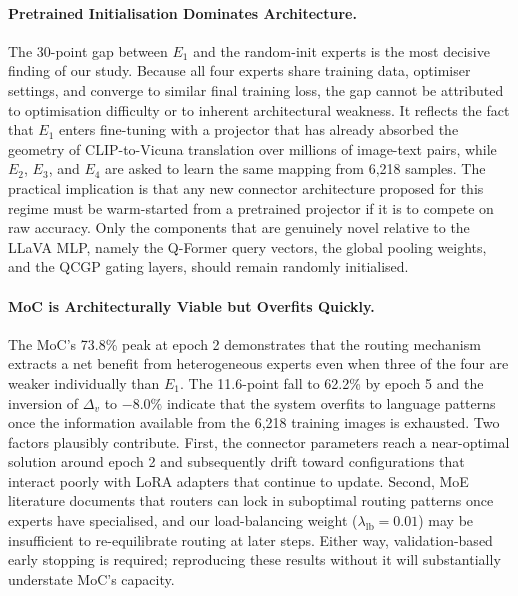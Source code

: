 \documentclass{article}
\begin{document}
\paragraph{Pretrained Initialisation Dominates Architecture.}
The 30-point gap between $E_1$ and the random-init experts is the most decisive finding of our study. Because all four experts share training data, optimiser settings, and converge to similar final training loss, the gap cannot be attributed to optimisation difficulty or to inherent architectural weakness. It reflects the fact that $E_1$ enters fine-tuning with a projector that has already absorbed the geometry of CLIP-to-Vicuna translation over millions of image-text pairs, while $E_2$, $E_3$, and $E_4$ are asked to learn the same mapping from 6{,}218 samples. The practical implication is that any new connector architecture proposed for this regime must be warm-started from a pretrained projector if it is to compete on raw accuracy. Only the components that are genuinely novel relative to the LLaVA MLP, namely the Q-Former query vectors, the global pooling weights, and the QCGP gating layers, should remain randomly initialised.

\paragraph{MoC is Architecturally Viable but Overfits Quickly.}
The MoC's 73.8\% peak at epoch 2 demonstrates that the routing mechanism extracts a net benefit from heterogeneous experts even when three of the four are weaker individually than $E_1$. The 11.6-point fall to 62.2\% by epoch 5 and the inversion of $\Delta_v$ to $-8.0\%$ indicate that the system overfits to language patterns once the information available from the 6{,}218 training images is exhausted. Two factors plausibly contribute. First, the connector parameters reach a near-optimal solution around epoch 2 and subsequently drift toward configurations that interact poorly with LoRA adapters that continue to update. Second, MoE literature documents that routers can lock in suboptimal routing patterns once experts have specialised, and our load-balancing weight ($\lambda_{\text{lb}} = 0.01$) may be insufficient to re-equilibrate routing at later steps. Either way, validation-based early stopping is required; reproducing these results without it will substantially understate MoC's capacity.
\end{document}
